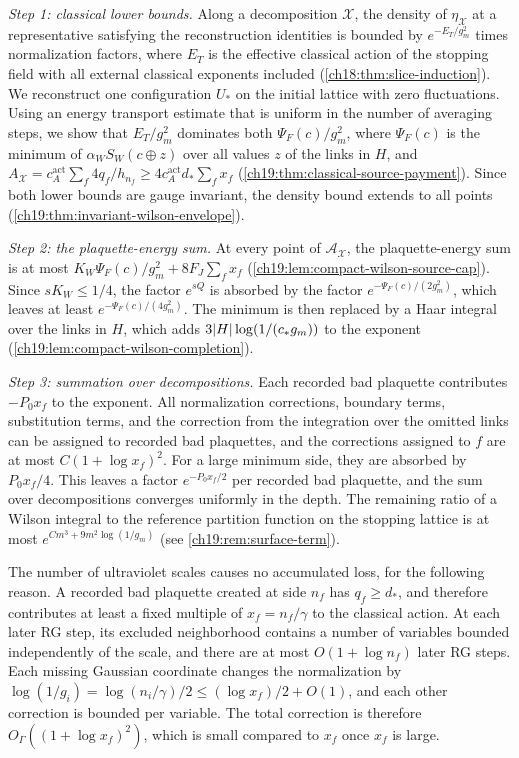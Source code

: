 \emph{Step 1: classical lower bounds.} Along a decomposition $\mathcal X$, the density of $\eta_{\mathcal X}$ at a representative satisfying the reconstruction identities is bounded by $e^{-E_T/g_m^2}$ times normalization factors, where $E_T$ is the effective classical action of the stopping field with all external classical exponents included (\cref{ch18:thm:slice-induction}). We reconstruct one configuration $U_*$ on the initial lattice with zero fluctuations. Using an energy transport estimate that is uniform in the number of averaging steps, we show that $E_T/g_m^2$ dominates both $\Psi_F(c)/g_m^2$, where $\Psi_F(c)$ is the minimum of $\alpha_WS_W(c\oplus z)$ over all values $z$ of the links in $H$, and $A_{\mathcal X}=c_A^{\mathrm{act}}\sum_f4q_f/h_{n_f}\ge4c_A^{\mathrm{act}}d_*\sum_fx_f$ (\cref{ch19:thm:classical-source-payment}). Since both lower bounds are gauge invariant, the density bound extends to all points (\cref{ch19:thm:invariant-wilson-envelope}).

\emph{Step 2: the plaquette-energy sum.} At every point of $\mathcal A_{\mathcal X}$, the plaquette-energy sum is at most $K_W\Psi_F(c)/g_m^2+8F_J\sum_fx_f$ (\cref{ch19:lem:compact-wilson-source-cap}). Since $sK_W\le1/4$, the factor $e^{sQ}$ is absorbed by the factor $e^{-\Psi_F(c)/(2g_m^2)}$, which leaves at least $e^{-\Psi_F(c)/(4g_m^2)}$. The minimum is then replaced by a Haar integral over the links in $H$, which adds $3\lvert H\rvert\log(1/(c_*g_m))$ to the exponent (\cref{ch19:lem:compact-wilson-completion}).

\emph{Step 3: summation over decompositions.} Each recorded bad plaquette contributes $-P_0x_f$ to the exponent. All normalization corrections, boundary terms, substitution terms, and the correction from the integration over the omitted links can be assigned to recorded bad plaquettes, and the corrections assigned to $f$ are at most $C(1+\log x_f)^2$. For a large minimum side, they are absorbed by $P_0x_f/4$. This leaves a factor $e^{-P_0x_f/2}$ per recorded bad plaquette, and the sum over decompositions converges uniformly in the depth. The remaining ratio of a Wilson integral to the reference partition function on the stopping lattice is at most $e^{Cm^3+9m^2\log(1/g_m)}$ (see \cref{ch19:rem:surface-term}).

The number of ultraviolet scales causes no accumulated loss, for the following reason. A recorded bad plaquette created at side $n_f$ has $q_f\ge d_*$, and therefore contributes at least a fixed multiple of $x_f=n_f/\gamma$ to the classical action. At each later RG step, its excluded neighborhood contains a number of variables bounded independently of the scale, and there are at most $O(1+\log n_f)$ later RG steps. Each missing Gaussian coordinate changes the normalization by $\log(1/g_i)=\log(n_i/\gamma)/2\le(\log x_f)/2+O(1)$, and each other correction is bounded per variable. The total correction is therefore $O_\Gamma((1+\log x_f)^2)$, which is small compared to $x_f$ once $x_f$ is large.

